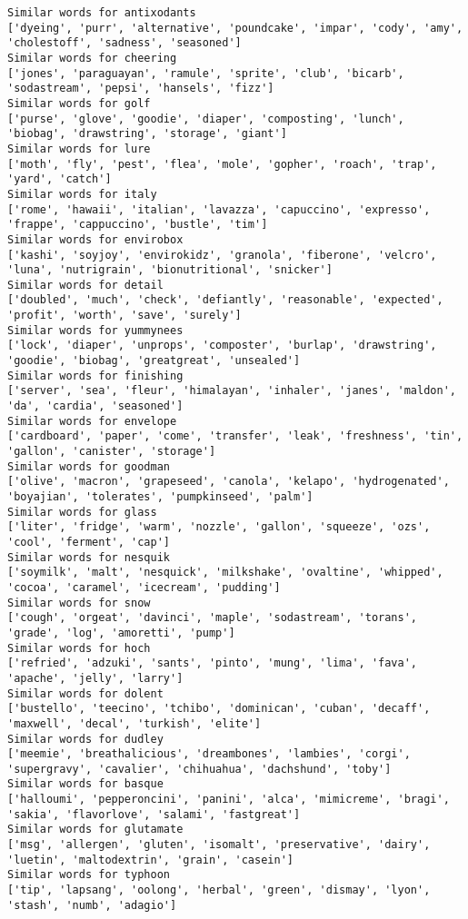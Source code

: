 \documentclass[11pt]{article}
\begin{document}
\begin{Verbatim}[commandchars=\\\{\}]
Similar words for antixodants
['dyeing', 'purr', 'alternative', 'poundcake', 'impar', 'cody', 'amy', 'cholestoff', 'sadness', 'seasoned']
Similar words for cheering
['jones', 'paraguayan', 'ramule', 'sprite', 'club', 'bicarb', 'sodastream', 'pepsi', 'hansels', 'fizz']
Similar words for golf
['purse', 'glove', 'goodie', 'diaper', 'composting', 'lunch', 'biobag', 'drawstring', 'storage', 'giant']
Similar words for lure
['moth', 'fly', 'pest', 'flea', 'mole', 'gopher', 'roach', 'trap', 'yard', 'catch']
Similar words for italy
['rome', 'hawaii', 'italian', 'lavazza', 'capuccino', 'expresso', 'frappe', 'cappuccino', 'bustle', 'tim']
Similar words for envirobox
['kashi', 'soyjoy', 'envirokidz', 'granola', 'fiberone', 'velcro', 'luna', 'nutrigrain', 'bionutritional', 'snicker']
Similar words for detail
['doubled', 'much', 'check', 'defiantly', 'reasonable', 'expected', 'profit', 'worth', 'save', 'surely']
Similar words for yummynees
['lock', 'diaper', 'unprops', 'composter', 'burlap', 'drawstring', 'goodie', 'biobag', 'greatgreat', 'unsealed']
Similar words for finishing
['server', 'sea', 'fleur', 'himalayan', 'inhaler', 'janes', 'maldon', 'da', 'cardia', 'seasoned']
Similar words for envelope
['cardboard', 'paper', 'come', 'transfer', 'leak', 'freshness', 'tin', 'gallon', 'canister', 'storage']
Similar words for goodman
['olive', 'macron', 'grapeseed', 'canola', 'kelapo', 'hydrogenated', 'boyajian', 'tolerates', 'pumpkinseed', 'palm']
Similar words for glass
['liter', 'fridge', 'warm', 'nozzle', 'gallon', 'squeeze', 'ozs', 'cool', 'ferment', 'cap']
Similar words for nesquik
['soymilk', 'malt', 'nesquick', 'milkshake', 'ovaltine', 'whipped', 'cocoa', 'caramel', 'icecream', 'pudding']
Similar words for snow
['cough', 'orgeat', 'davinci', 'maple', 'sodastream', 'torans', 'grade', 'log', 'amoretti', 'pump']
Similar words for hoch
['refried', 'adzuki', 'sants', 'pinto', 'mung', 'lima', 'fava', 'apache', 'jelly', 'larry']
Similar words for dolent
['bustello', 'teecino', 'tchibo', 'dominican', 'cuban', 'decaff', 'maxwell', 'decal', 'turkish', 'elite']
Similar words for dudley
['meemie', 'breathalicious', 'dreambones', 'lambies', 'corgi', 'supergravy', 'cavalier', 'chihuahua', 'dachshund', 'toby']
Similar words for basque
['halloumi', 'pepperoncini', 'panini', 'alca', 'mimicreme', 'bragi', 'sakia', 'flavorlove', 'salami', 'fastgreat']
Similar words for glutamate
['msg', 'allergen', 'gluten', 'isomalt', 'preservative', 'dairy', 'luetin', 'maltodextrin', 'grain', 'casein']
Similar words for typhoon
['tip', 'lapsang', 'oolong', 'herbal', 'green', 'dismay', 'lyon', 'stash', 'numb', 'adagio']

\end{Verbatim}
\end{document}
